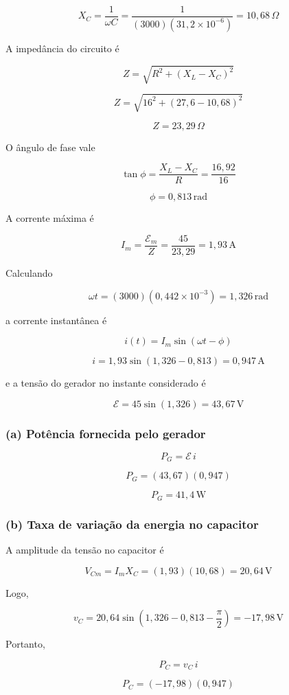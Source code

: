 \[
X_C=\frac{1}{\omega C}
=
\frac{1}{(3000)(31,2\times10^{-6})}
=10,68\,\Omega
\]

A impedância do circuito é

\[
Z=\sqrt{R^2+(X_L-X_C)^2}
\]

\[
Z=\sqrt{16^2+(27,6-10,68)^2}
\]

\[
Z=23,29\,\Omega
\]

O ângulo de fase vale

\[
\tan\phi=
\frac{X_L-X_C}{R}
=
\frac{16,92}{16}
\]

\[
\phi=0,813\,\text{rad}
\]

A corrente máxima é

\[
I_m=\frac{\mathcal{E}_m}{Z}
=
\frac{45}{23,29}
=
1,93\,\text{A}
\]

Calculando

\[
\omega t
=
(3000)(0,442\times10^{-3})
=
1,326\,\text{rad}
\]

a corrente instantânea é

\[
i(t)
=
I_m\sin(\omega t-\phi)
\]

\[
i
=
1,93\sin(1,326-0,813)
=
0,947\,\text{A}
\]

e a tensão do gerador no instante considerado é

\[
\mathcal{E}
=
45\sin(1,326)
=
43,67\,\text{V}
\]

\subsubsection*{(a) Potência fornecida pelo gerador}

\[
P_G
=
\mathcal{E}\,i
\]

\[
P_G
=
(43,67)(0,947)
\]

\[
\boxed{P_G=41,4\,\text{W}}
\]

\subsubsection*{(b) Taxa de variação da energia no capacitor}

A amplitude da tensão no capacitor é

\[
V_{Cm}=I_mX_C
=(1,93)(10,68)
=20,64\,\text{V}
\]

Logo,

\[
v_C
=
20,64
\sin\!\left(
1,326-0,813-\frac{\pi}{2}
\right)
=
-17,98\,\text{V}
\]

Portanto,

\[
P_C=v_C\,i
\]

\[
P_C
=
(-17,98)(0,947)
\]


